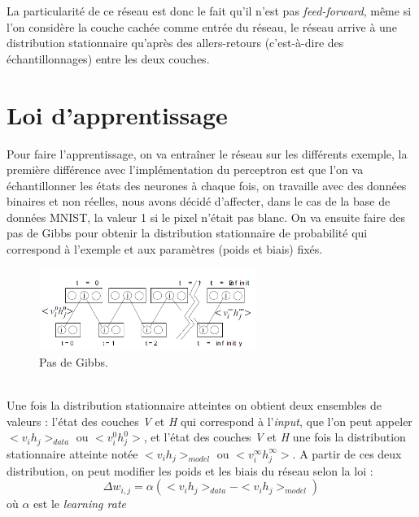 \documentclass[a4paper,oneside]{report}
\begin{document}
 La particularité de ce réseau est donc le fait qu'il n'est pas
                \textit{feed-forward}, même si l'on considère la couche cachée comme entrée du
               réseau, le réseau arrive à une distribution stationnaire qu'après des allers-retours (c'est-à-dire des échantillonnages) entre
les deux couches.

\section{Loi d'apprentissage}

Pour faire l'apprentissage, on va entraîner le réseau sur les différents exemple, la première différence avec l'implémentation du perceptron est
que l'on va  échantillonner les états des neurones à chaque fois, on travaille avec des données binaires et non réelles, nous avons décidé 
d'affecter, dans le cas de la base de données MNIST, la valeur 1 si le pixel n'était pas blanc.
On va ensuite faire des pas de Gibbs pour obtenir la distribution stationnaire de probabilité
 qui correspond à l'exemple et aux paramètres (poids et biais) fixés.
\begin{figure}[!h]
                    \begin{center}
                        \includegraphics[width=200pt]{Images/Gibbs.png}
                    \end{center}
                    \caption{Pas de Gibbs.}
\end{figure}\\

Une fois la distribution stationnaire atteintes on obtient deux ensembles de valeurs : l'état des couches \textit{V} et  \textit{H}
qui correspond à l'\textit{input}, que l'on peut appeler \begin{math}<v_{i}h_{j}>_{data}\end{math} ou \begin{math}<v_{i}^{0}h_{j}^{0}>\end{math}, et l'état des couches \textit{V} et  \textit{H} une fois la distribution stationnaire atteinte notée \begin{math}<v_{i}h_{j}>_{model}\end{math} ou \begin{math}<v_{i}^{\infty}h_{j}^{\infty}>\end{math}. A partir de ces deux distribution, on peut modifier les poids et les biais du réseau selon la loi :
                \begin{equation}
                    \Delta w_{i,j} = \alpha (<v_{i}h_{j}>_{data} - <v_{i}h_{j}>_{model} )
                \end{equation}
                où \begin{math}\alpha\end{math} est le \textit{learning rate}\\
\end{document}
